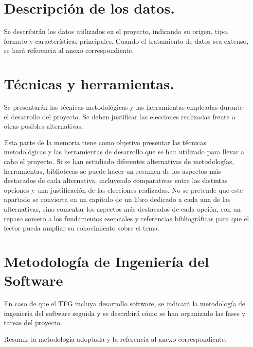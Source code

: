 
\section{Descripción de los datos.}
Se describirán los datos utilizados en el proyecto, indicando su origen, tipo, formato y características principales. 
Cuando el tratamiento de datos sea extenso, se hará referencia al anexo correspondiente.

\section{Técnicas y herramientas.}

Se presentarán las técnicas metodológicas y las herramientas empleadas durante el desarrollo del proyecto. 
Se deben justificar las elecciones realizadas frente a otras posibles alternativas.

Esta parte de la memoria tiene como objetivo presentar las técnicas metodológicas y las herramientas de desarrollo que se han utilizado para llevar a cabo el proyecto. Si se han estudiado diferentes alternativas de metodologías, herramientas, bibliotecas se puede hacer un resumen de los aspectos más destacados de cada alternativa, incluyendo comparativas entre las distintas opciones y una justificación de las elecciones realizadas. 
No se pretende que este apartado se convierta en un capítulo de un libro dedicado a cada una de las alternativas, sino comentar los aspectos más destacados de cada opción, con un repaso somero a los fundamentos esenciales y referencias bibliográficas para que el lector pueda ampliar su conocimiento sobre el tema.


\section{Metodología de Ingeniería del Software}

En caso de que el TFG incluya desarrollo software, se indicará la metodología de ingeniería del software seguida y se describirá cómo se han organizado las fases y tareas del proyecto.

Resumir la metodología adoptada y la referencia al anexo correspondiente.